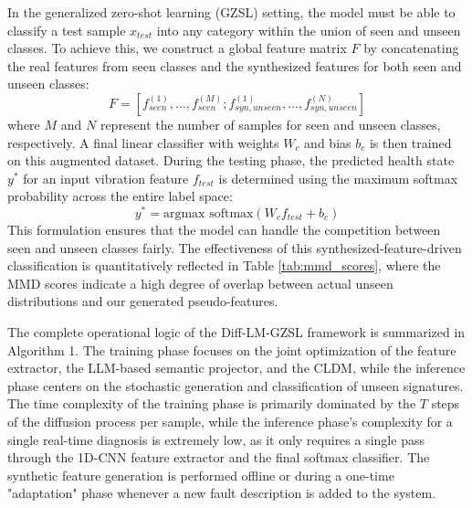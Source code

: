 In the generalized zero-shot learning (GZSL) setting, the model must be able to classify a test sample $x_{test}$ into any category within the union of seen and unseen classes. To achieve this, we construct a global feature matrix $F$ by concatenating the real features from seen classes and the synthesized features for both seen and unseen classes:
\begin{equation}
F = [f_{seen}^{(1)}, \dots, f_{seen}^{(M)}; f_{syn, unseen}^{(1)}, \dots, f_{syn, unseen}^{(N)}]
\end{equation}
where $M$ and $N$ represent the number of samples for seen and unseen classes, respectively. A final linear classifier with weights $W_c$ and bias $b_c$ is then trained on this augmented dataset. During the testing phase, the predicted health state $y^*$ for an input vibration feature $f_{test}$ is determined using the maximum softmax probability across the entire label space:
\begin{equation}
y^* = \text{argmax } \text{softmax}(W_c f_{test} + b_c)
\end{equation}
This formulation ensures that the model can handle the competition between seen and unseen classes fairly. The effectiveness of this synthesized-feature-driven classification is quantitatively reflected in Table \ref{tab:mmd_scores}, where the MMD scores indicate a high degree of overlap between actual unseen distributions and our generated pseudo-features.

The complete operational logic of the Diff-LM-GZSL framework is summarized in Algorithm 1. The training phase focuses on the joint optimization of the feature extractor, the LLM-based semantic projector, and the CLDM, while the inference phase centers on the stochastic generation and classification of unseen signatures. The time complexity of the training phase is primarily dominated by the $T$ steps of the diffusion process per sample, while the inference phase's complexity for a single real-time diagnosis is extremely low, as it only requires a single pass through the 1D-CNN feature extractor and the final softmax classifier. The synthetic feature generation is performed offline or during a one-time "adaptation" phase whenever a new fault description is added to the system.

